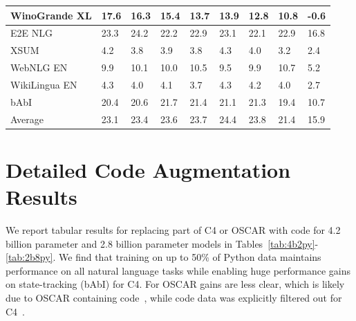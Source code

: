 \documentclass{article}
\begin{document}
\begin{table}
{\begin{tabular}{l|llllllll}
WinoGrande XL & 17.6 & 16.3 & 15.4 & 13.7 & 13.9 & 12.8 & 10.8 & -0.6 \\
\midrule
E2E NLG & 23.3 & 24.2 & 22.2 & 22.9 & 23.1 & 22.1 & 22.9 & 16.8 \\
XSUM & 4.2 & 3.8 & 3.9 & 3.8 & 4.3 & 4.0 & 3.2 & 2.4 \\
WebNLG EN & 9.9 & 10.1 & 10.0 & 10.5 & 9.5 & 9.9 & 10.7 & 5.2 \\
WikiLingua EN & 4.3 & 4.0 & 4.1 & 3.7 & 4.3 & 4.2 & 4.0 & 2.7 \\
\midrule
bAbI & 20.4 & 20.6 & 21.7 & 21.4 & 21.1 & 21.3 & 19.4 & 10.7 \\
\midrule
Average & 23.1 & 23.4 & 23.6 & 23.7 & 24.4 & 23.8 & 21.4 & 15.9 \\
\bottomrule
  \end{tabular}
  }
  \label{tab:8b7oscarrep}
\end{table}

\FloatBarrier

\section{Detailed Code Augmentation Results}
\label{sec:code}

We report tabular results for replacing part of C4 or OSCAR with code for 4.2 billion parameter and 2.8 billion parameter models in Tables~\ref{tab:4b2py}-\ref{tab:2b8py}. We find that training on up to 50\% of Python data maintains performance on all natural language tasks while enabling huge performance gains on state-tracking (bAbI) for C4. For OSCAR gains are less clear, which is likely due to OSCAR containing code~\cite{ortiz-suarez-etal-2020-monolingual}, while code data was explicitly filtered out for C4~\cite{raffel2020exploring}.
\end{document}
